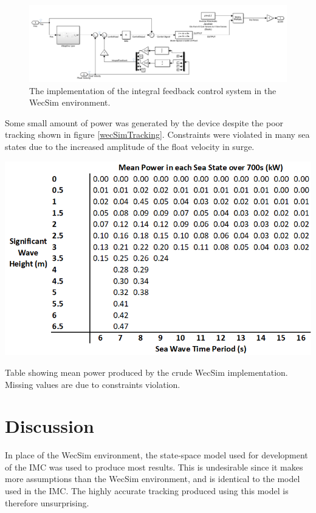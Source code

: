 \documentclass{report}
\begin{document}
\begin{figure}
\centering
\includegraphics[scale=0.5]{graphics/wecSimImplementation}
\caption{The implementation of the integral feedback control system in the WecSim environment.}
\label{wecSimImplementation}
\end{figure} 

Some small amount of power was generated by the device despite the poor tracking shown in figure \ref{wecSimTracking}. Constraints were violated in many sea states due to the increased amplitude of the float velocity in surge.

\begin{table}
\centering
\includegraphics[scale=0.7]{tables/wecSimResults}
\caption{Table showing mean power produced by the crude WecSim implementation. Missing values are due to constraints violation.}
\label{wecSimResults}
\end{table}

\chapter{Discussion}

In place of the WecSim environment, the state-space model used for development of the IMC was used to produce most results. This is undesirable since it makes more assumptions than the WecSim environment, and is identical to the model used in the IMC. The highly accurate tracking produced using this model is therefore unsurprising.
\end{document}
